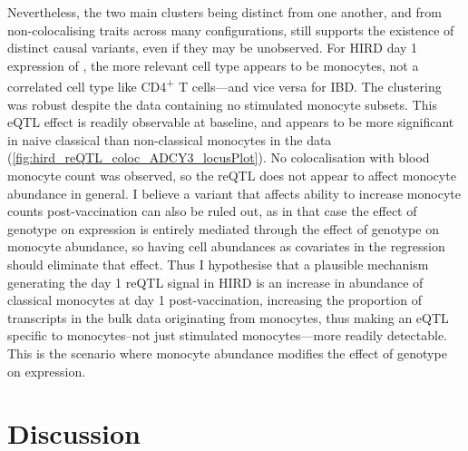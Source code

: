 Nevertheless, the two main clusters being distinct from one another, and from non-colocalising traits across many configurations,
still supports the existence of distinct causal variants, even if they may be unobserved.
For \gls{HIRD} day 1 expression of , the more relevant cell type appears to be monocytes, not a correlated cell type like CD4\textsuperscript{+} T cells---and vice versa for \gls{IBD}.
The clustering was robust despite the data containing no stimulated monocyte subsets.
This \gls{eQTL} effect is readily observable at baseline, and appears to be more significant in naive classical than non-classical monocytes in the \autocite{schmiedel2018ImpactGeneticPolymorphisms} data (\cref{fig:hird_reQTL_coloc_ADCY3_locusPlot}).
No colocalisation with blood monocyte count was observed, 
so the \gls{reQTL} does not appear to affect monocyte abundance in general.
I believe a variant that affects ability to increase monocyte counts post-vaccination can also be ruled out,
as in that case the effect of genotype on expression is entirely mediated through the effect of genotype on monocyte abundance,
so having cell abundances as covariates in the regression should eliminate that effect.
Thus I hypothesise that a plausible mechanism generating the day 1 \gls{reQTL} signal in \gls{HIRD}
is an increase in abundance of classical monocytes at day 1 post-vaccination,
increasing the proportion of  transcripts in the bulk data originating from monocytes,
thus making an \gls{eQTL} specific to monocytes--not just stimulated monocytes---more readily detectable.
This is the scenario where monocyte abundance modifies the effect of genotype on expression.

\section{Discussion}

